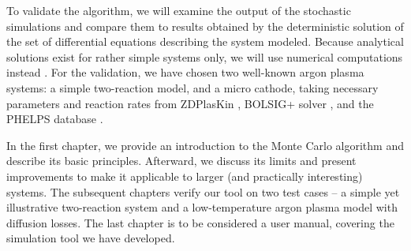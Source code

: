 To validate the algorithm, we will examine the output of the stochastic simulations and compare them to results obtained by the deterministic solution of the set of differential equations describing the system modeled. Because analytical solutions exist for rather simple systems only, we will use numerical computations instead  \cite{gillespie77}. For the validation, we have chosen two well-known argon plasma systems: a simple two-reaction model, and a micro cathode, taking necessary parameters and reaction rates from ZDPlasKin \cite{zdplaskin}, BOLSIG+ solver \cite{bolsig}, and the PHELPS database \cite{TODO}.

In the first chapter, we provide an introduction to the Monte Carlo algorithm and describe its basic principles. Afterward, we discuss its limits and present improvements to make it applicable to larger (and practically interesting) systems. The subsequent chapters verify our tool on two test cases -- a simple yet illustrative two-reaction system and a low-temperature argon plasma model with diffusion losses. The last chapter is to be considered a user manual, covering the simulation tool we have developed. 